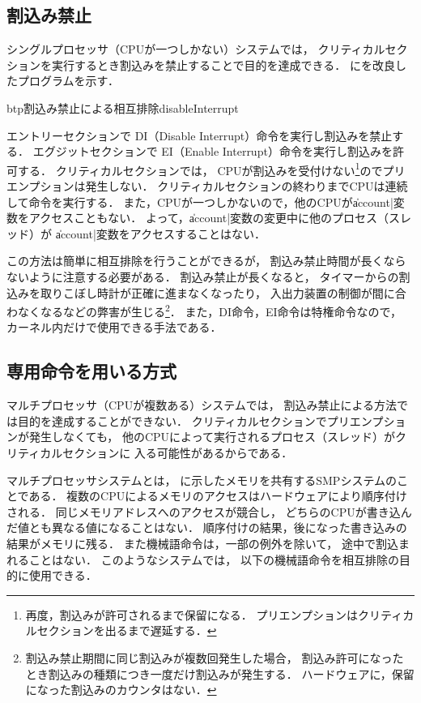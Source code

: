 \subsection{割込み禁止}
\label{disableInterrupt}
シングルプロセッサ（CPUが一つしかない）システムでは，
クリティカルセクションを実行するとき割込みを禁止することで目的を達成できる．
にを改良したプログラムを示す．

\begin{myfig}{btp}{割込み禁止による相互排除}{disableInterrupt}
  
\end{myfig}

エントリーセクションで
DI（Disable Interrupt）命令を実行し割込みを禁止する．
エグジットセクションで
EI（Enable Interrupt）命令を実行し割込みを許可する．
クリティカルセクションでは，
CPUが割込みを受付けない\footnote{
  再度，割込みが許可されるまで保留になる．
  プリエンプションはクリティカルセクションを出るまで遅延する．
}のでプリエンプションは発生しない．
クリティカルセクションの終わりまでCPUは連続して命令を実行する．
また，CPUが一つしかないので，他のCPUが\|account|変数をアクセスこともない．
よって，\|account|変数の変更中に他のプロセス（スレッド）が
\|account|変数をアクセスすることはない．

この方法は簡単に相互排除を行うことができるが，
割込み禁止時間が長くならないように注意する必要がある．
割込み禁止が長くなると，
タイマーからの割込みを取りこぼし時計が正確に進まなくなったり，
入出力装置の制御が間に合わなくなるなどの弊害が生じる\footnote{
  割込み禁止期間に同じ割込みが複数回発生した場合，
  割込み許可になったとき割込みの種類につき一度だけ割込みが発生する．
  ハードウェアに，保留になった割込みのカウンタはない．}．
また，DI命令，EI命令は特権命令なので，
カーネル内だけで使用できる手法である．

\subsection{専用命令を用いる方式}
マルチプロセッサ（CPUが複数ある）システムでは，
割込み禁止による方法では目的を達成することができない．
クリティカルセクションでプリエンプションが発生しなくても，
他のCPUによって実行されるプロセス（スレッド）がクリティカルセクションに
入る可能性があるからである．

マルチプロセッサシステムとは，
に示したメモリを共有するSMPシステムのことである．
複数のCPUによるメモリのアクセスはハードウェアにより順序付けされる．
同じメモリアドレスへのアクセスが競合し，
どちらのCPUが書き込んだ値とも異なる値になることはない．
順序付けの結果，後になった書き込みの結果がメモリに残る．
また機械語命令は，一部の例外を除いて，
途中で割込まれることはない．
このようなシステムでは，
以下の機械語命令を相互排除の目的に使用できる．


